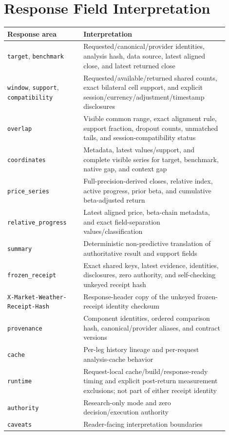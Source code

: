 \documentclass{article}
\begin{document}
\clearpage
\section{Response Field Interpretation}

\begin{center}
\centering
\small
\setlength{\tabcolsep}{4pt}
\begin{tabular}{p{0.31\linewidth}p{0.59\linewidth}}
\toprule
Response area & Interpretation \\
\midrule
\texttt{target}, \texttt{benchmark} & Requested/canonical/provider identities, analysis hash, data source, latest aligned close, and latest returned close \\
\texttt{window}, \texttt{support}, \texttt{compatibility} & Requested/available/returned shared counts, exact bilateral cell support, and explicit session/currency/adjustment/timestamp disclosures \\
\texttt{overlap} & Visible common range, exact alignment rule, support fraction, dropout counts, unmatched tails, and session-compatibility status \\
\texttt{coordinates} & Metadata, latest values/support, and complete visible series for target, benchmark, native gap, and context gap \\
\texttt{price\_series} & Full-precision-derived closes, relative index, active progress, prior beta, and cumulative beta-adjusted return \\
\texttt{relative\_progress} & Latest aligned price, beta-chain metadata, and exact field-separation values/classification \\
\texttt{summary} & Deterministic non-predictive translation of authoritative result and support fields \\
\texttt{frozen\_receipt} & Exact shared keys, latest evidence, identities, disclosures, zero authority, and self-checking unkeyed receipt hash \\
\texttt{X-Market-Weather-Receipt-Hash} & Response-header copy of the unkeyed frozen-receipt identity checksum \\
\texttt{provenance} & Component identities, ordered comparison hash, canonical/provider aliases, and contract versions \\
\texttt{cache} & Per-leg history lineage and per-request analysis-cache behavior \\
\texttt{runtime} & Request-local cache/build/response-ready timing and explicit post-return measurement exclusions; not part of either receipt identity \\
\texttt{authority} & Research-only mode and zero decision/execution authority \\
\texttt{caveats} & Reader-facing interpretation boundaries \\
\bottomrule
\end{tabular}
\end{center}
\end{document}
